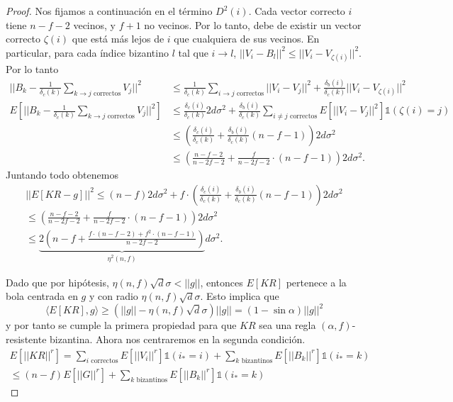 \begin{proof}
	Nos fijamos a continuación en el término $D^2(i)$. Cada vector correcto $i$ tiene $n-f-2$ vecinos, y $f+1$ no vecinos. Por lo tanto, debe de existir un vector correcto $\zeta(i)$ que está más lejos de $i$ que cualquiera de sus vecinos. En particular, para cada índice bizantino $l$ tal que $i \to l$, $||V_i - B_l||^2 \le ||V_i - V_{\zeta(i)}||^2$. Por lo tanto
	\begin{equation}\begin{split}
			||B_k - \frac{1}{\delta_c(k)}\sum_{k \to j \text{ correctos}}V_j||^2 & \le \frac{1}{\delta_c(k)} \sum_{i \to j \text{ correctos}}||V_i - V_j||^2 + \frac{\delta_b(i)}{\delta_c(k)}||V_i - V_{\zeta(i)}||^2 \\
			E[||B_k - \frac{1}{\delta_c(k)}\sum_{k \to j \text{ correctos}}V_j||^2] & \le \frac{\delta_c(i)}{\delta_c(k)}2d\sigma^2 + \frac{\delta_b(i)}{\delta_c(k)} \sum_{i \ne j \text{ correctos}} E[||V_i - V_j||^2]\mathbb{1}(\zeta(i) = j) \\
			& \le \left( \frac{\delta_c(i)}{\delta_c(k)} + \frac{\delta_b(i)}{\delta_c(k)}(n-f-1) \right)2d\sigma^2 \\
			& \le \left( \frac{n-f-2}{n-2f-2} + \frac{f}{n-2f-2}\cdot (n-f-1) \right)2d\sigma^2.
	\end{split}\end{equation}
	Juntando todo obtenemos
	\begin{equation}\begin{split}
			||E[KR-g]||^2 \le (n-f)2d\sigma^2 + f \cdot \left( \frac{\delta_c(i)}{\delta_c(k)} + \frac{\delta_b(i)}{\delta_c(k)}(n-f-1) \right)2d\sigma^2 \\
			\le \left( \frac{n-f-2}{n-2f-2} + \frac{f}{n-2f-2}\cdot (n-f-1) \right)2d\sigma^2 \\
			\le \underbrace{2\left( n-f+\frac{f \cdot (n-f-2) + f^2 \cdot (n-f-1)}{n-2f-2} \right)}_{\eta^2(n,f)}d\sigma^2.
	\end{split}\end{equation}
	
	Dado que por hipótesis, $\eta(n,f)\sqrt{d}\sigma < ||g||$, entonces $E[KR]$ pertenece a la bola centrada en $g$ y con radio $\eta(n,f)\sqrt{d}\sigma$. Esto implica que
	\begin{equation}
		\langle E[KR], g\rangle \ge (||g|| - \eta(n,f)\sqrt{d}\sigma) ||g|| = (1 - \sin \alpha) ||g||^2
	\end{equation}
	y por tanto se cumple la primera propiedad para que $KR$ sea una regla $(\alpha, f)$-resistente bizantina. Ahora nos centraremos en la segunda condición.
	\begin{equation}\begin{split}
			E[||KR||^r] = \sum_{i \text{ correctos}}E[||V_i||^r]\mathbb{1}(i_*=i) +  \sum_{k \text{ bizantinos}}E[||B_k||^r]\mathbb{1}(i_*=k) \\
			\le (n-f)E[||G||^r] + \sum_{k \text{ bizantinos}}E[||B_k||^r]\mathbb{1}(i_*=k)
	\end{split}\end{equation}
	

\end{proof}
